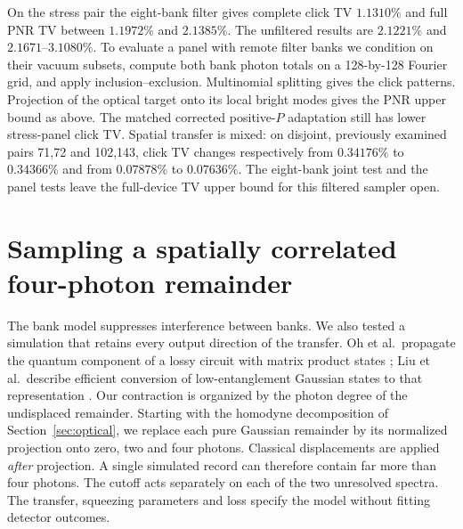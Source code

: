 \documentclass[11pt]{article}
\begin{document}
On the stress pair the eight-bank filter gives complete click TV $1.1310\%$ and full PNR TV between $1.1972\%$ and $2.1385\%$. The unfiltered results are $2.1221\%$ and $2.1671$--$3.1080\%$. To evaluate a panel with remote filter banks we condition on their vacuum subsets, compute both bank photon totals on a 128-by-128 Fourier grid, and apply inclusion--exclusion. Multinomial splitting gives the click patterns. Projection of the optical target onto its local bright modes gives the PNR upper bound as above. The matched corrected positive-$P$ adaptation still has lower stress-panel click TV. Spatial transfer is mixed: on disjoint, previously examined pairs 71,72 and 102,143, click TV changes respectively from $0.34176\%$ to $0.34366\%$ and from $0.07878\%$ to $0.07636\%$. The eight-bank joint test and the panel tests leave the full-device TV upper bound for this filtered sampler open.

\section{Sampling a spatially correlated four-photon remainder}\label{sec:quartic}
The bank model suppresses interference between banks. We also tested a simulation that retains every output direction of the transfer. Oh et al.\ propagate the quantum component of a lossy circuit with matrix product states \cite{oh}; Liu et al.\ describe efficient conversion of low-entanglement Gaussian states to that representation \cite{liu}. Our contraction is organized by the photon degree of the undisplaced remainder. Starting with the homodyne decomposition of Section~\ref{sec:optical}, we replace each pure Gaussian remainder by its normalized projection onto zero, two and four photons. Classical displacements are applied \emph{after} projection. A single simulated record can therefore contain far more than four photons. The cutoff acts separately on each of the two unresolved spectra. The transfer, squeezing parameters and loss specify the model without fitting detector outcomes.
\end{document}
